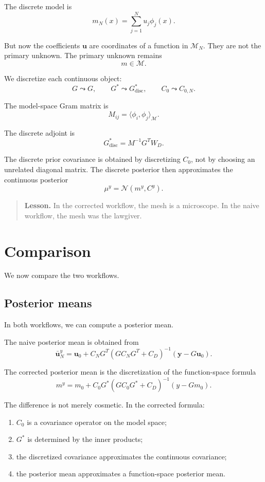\documentclass[11pt,a4paper]{book}
\newenvironment{lesson}
  {\begin{quote}\textbf{Lesson.}}
  {\end{quote}}
\newcommand{\M}{\mathcal{M}}      %
\newcommand{\post}{\mu^y}
\newcommand{\obs}{y}
\newcommand{\G}{G}
\newcommand{\Gadj}{G^\ast}
\begin{document}
The discrete model is
\[
    m_N(x)
    =
    \sum_{j=1}^N u_j\phi_j(x).
\]

But now the coefficients $\bm{u}$ are coordinates of a function in $\M_N$.
They are not the primary unknown. The primary unknown remains
\[
    m\in\M.
\]

We discretize each continuous object:
\[
    \G
    \leadsto
    G,
    \qquad
    \Gadj
    \leadsto
    G^\ast_{\mathrm{disc}},
    \qquad
    C_0
    \leadsto
    C_{0,N}.
\]

The model-space Gram matrix is
\[
    M_{ij}
    =
    \langle \phi_i,\phi_j\rangle_{\M}.
\]

The discrete adjoint is
\[
    G^\ast_{\mathrm{disc}}
    =
    M^{-1}G^T W_D.
\]

The discrete prior covariance is obtained by discretizing $C_0$, not by
choosing an unrelated diagonal matrix. The discrete posterior then approximates
the continuous posterior
\[
    \post=\mathcal{N}(m^y,C^y).
\]

\begin{lesson}
In the corrected workflow, the mesh is a microscope. In the naive workflow, the
mesh was the lawgiver.
\end{lesson}

\section{Comparison}

We now compare the two workflows.

\subsection{Posterior means}

In both workflows, we can compute a posterior mean.

The naive posterior mean is obtained from
\[
    \bar{\bm{u}}_N^y
    =
    \bm{u}_0
    +
    C_NG^T
    \left(
        GC_NG^T+C_D
    \right)^{-1}
    (\bm{y}-G\bm{u}_0).
\]

The corrected posterior mean is the discretization of the function-space
formula
\[
    m^y
    =
    m_0
    +
    C_0\Gadj
    \left(
        \G C_0\Gadj+C_D
    \right)^{-1}
    (\obs-\G m_0).
\]

The difference is not merely cosmetic. In the corrected formula:
\begin{enumerate}[label=\arabic*.]
    \item $C_0$ is a covariance operator on the model space;
    \item $\Gadj$ is determined by the inner products;
    \item the discretized covariance approximates the continuous covariance;
    \item the posterior mean approximates a function-space posterior mean.
\end{enumerate}
\end{document}
